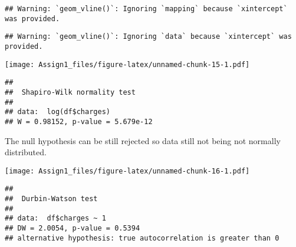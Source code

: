 \documentclass[
]{article}
\newenvironment{Shaded}{\begin{snugshade}}{\end{snugshade}}
\newcommand{\AttributeTok}[1]{\textcolor[rgb]{0.77,0.63,0.00}{#1}}
\newcommand{\CommentTok}[1]{\textcolor[rgb]{0.56,0.35,0.01}{\textit{#1}}}
\newcommand{\DecValTok}[1]{\textcolor[rgb]{0.00,0.00,0.81}{#1}}
\newcommand{\FunctionTok}[1]{\textcolor[rgb]{0.00,0.00,0.00}{#1}}
\newcommand{\NormalTok}[1]{#1}
\newcommand{\SpecialCharTok}[1]{\textcolor[rgb]{0.00,0.00,0.00}{#1}}
\begin{document}
\begin{verbatim}
## Warning: `geom_vline()`: Ignoring `mapping` because `xintercept` was provided.
\end{verbatim}

\begin{verbatim}
## Warning: `geom_vline()`: Ignoring `data` because `xintercept` was provided.
\end{verbatim}

\texttt{[image: Assign1\_files/figure-latex/unnamed-chunk-15-1.pdf]}

\begin{Shaded}
\end{Shaded}

\begin{verbatim}
## 
##  Shapiro-Wilk normality test
## 
## data:  log(df$charges)
## W = 0.98152, p-value = 5.679e-12
\end{verbatim}

The null hypothesis can be still rejected so data still not being not
normally distributed.

\begin{Shaded}
\end{Shaded}

\texttt{[image: Assign1\_files/figure-latex/unnamed-chunk-16-1.pdf]}

\begin{Shaded}
\end{Shaded}

\begin{verbatim}
## 
##  Durbin-Watson test
## 
## data:  df$charges ~ 1
## DW = 2.0054, p-value = 0.5394
## alternative hypothesis: true autocorrelation is greater than 0
\end{verbatim}
\end{document}
